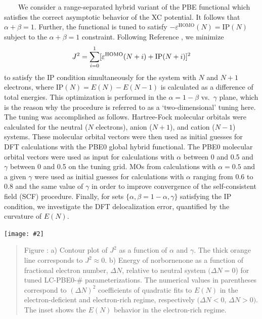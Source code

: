 \documentclass[landscape,a0b,final]{a0poster}
\newcommand{\bindent}{\ \ \ \ }
\newenvironment{poster}{
  \begin{center}
  \begin{minipage}[c]{0.98\textwidth}
}{
  \end{minipage} 
  \end{center}
}
\newcommand{\myfig}[3][0]{
\begin{center}
  \vspace{0.25cm}
  \texttt{[image: \#2]}
  \nobreak\medskip
\end{center}}
\newcommand{\mycaption}[1]{
  \vspace{0.25cm}
  \begin{quote}
    {{\sc Figure} \arabic{figure}: #1}
  \end{quote}
  \vspace{0.25cm}
  \stepcounter{figure}
}
\begin{document}
\begin{poster}
\begin{multicols}{3}
    \bindent We consider a range-separated hybrid variant of the PBE functional
    which satisfies the correct asymptotic behavior of the XC
    potential. It follows that $\alpha + \beta = 1$. Further, the
    functional is tuned to satisfy
    $-{\varepsilon}^{\text{HOMO}}(N)=\text{IP}(N)$ subject to the $\alpha
    + \beta = 1$ constraint. Following Reference
    , we minimize
        \vspace{-1.8cm}
    \begin{equation}
        \vspace{-1.8cm}
    J^2 =
    \sum_{i=0}^{1} [\varepsilon^{\text{HOMO}}(N+i)+\text{IP}(N+i)]^2 
    \label{eq:J2-criterion}
    \end{equation} 
    to satisfy the IP condition simultaneously for the system with $N$ and
    $N+1$ electrons, where $\text{IP}(N)= E(N)-E(N-1)$ is calculated as a
    difference of total energies. This optimization is performed in the
    $\alpha = 1-\beta$ vs.\ $\gamma$ plane, which is the reason why the
    procedure is referred to as a `two-dimensional' tuning here. The
    tuning was accomplished as follows. Hartree-Fock molecular orbitals
    were calculated for the neutral ($N$ electrons), anion ($N+1$), and
    cation ($N-1$) systems. These molecular orbital vectors were then used
    as initial guesses for DFT calculations with the PBE0 global hybrid
    functional. The PBE0 molecular orbital vectors were used as input for
    calculations with $\alpha$ between 0 and 0.5 and $\gamma$ between 0
    and 0.5 on the tuning grid. MOs from calculations with $\alpha = 0.5$
    and a given $\gamma$ were used as initial guesses for calculations
    with $\alpha$ ranging from 0.6 to 0.8 and the same value of $\gamma$
    in order to improve convergence of the self-consistent field (SCF)
    procedure.  Finally, for sets $\{\alpha,\beta = 1-\alpha,\gamma\}$
    satisfying the IP condition, we investigate the DFT delocalization
    error, quantified by the curvature of $E(N)$.
    \begin{center}
    \vspace*{1cm}
    \myfig[0]{figures/norbornenone-tuning-correct}{1.0}
    \mycaption{ a) Contour plot of $J^2$ as a function of
    $\alpha$ and $\gamma$. The thick orange line corresponds to $J^2
    \approx 0$. b) Energy of norbornenone as a function
    of fractional electron number, ${\Delta}N$, relative to neutral
    system $({\Delta}N = 0$) for tuned LC-PBE0-\# parameterizations. The
    numerical values in parentheses correspond to $({\Delta}N)^2$
    coefficients of quadratic fits to $E(N)$ in the electron-deficient
    and electron-rich regime, respectively $({\Delta}N < 0$, ${\Delta}N
    > 0)$. The inset shows the $E(N)$ behavior in the electron-rich
    regime.}
    \end{center}


\end{multicols}
\end{poster}
\end{document}

